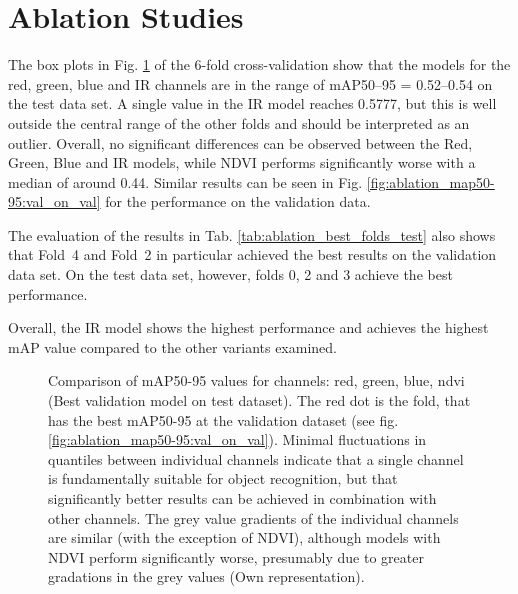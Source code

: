 \section{Ablation Studies}

The box plots in Fig. \ref{fig:ablation_map50-95:val_on_test} of the 6-fold cross-validation show that the models for the red, green, blue and IR channels are in the range of mAP50–95 = 0.52–0.54 on the test data set. A single value in the IR model reaches 0.5777, but this is well outside the central range of the other folds and should be interpreted as an outlier. Overall, no significant differences can be observed between the Red, Green, Blue and IR models, while NDVI performs significantly worse with a median of around 0.44. Similar results can be seen in Fig. \ref{fig:ablation_map50-95:val_on_val} for the performance on the validation data.

The evaluation of the results in Tab. \ref{tab:ablation_best_folds_test} also shows that Fold~4 and Fold~2 in particular achieved the best results on the validation data set. On the test data set, however, folds 0, 2 and 3 achieve the best performance.  

Overall, the IR model shows the highest performance and achieves the highest \acrshort{mAP} value compared to the other variants examined.




\begin{figure}[htbp]
    \centering
    
    \caption[Comparison of \acrshort{mAP}50-95 values for channels: red, green, blue, ndvi (Best validation model on test dataset)]{Comparison of \acrshort{mAP}50-95 values for channels: red, green, blue, ndvi (Best validation model on test dataset). The red dot is the fold, that has the best \acrshort{mAP}50-95 at the validation dataset (see fig. \ref{fig:ablation_map50-95:val_on_val}). Minimal fluctuations in quantiles between individual channels indicate that a single channel is fundamentally suitable for object recognition, but that significantly better results can be achieved in combination with other channels. The grey value gradients of the individual channels are similar (with the exception of NDVI), although models with NDVI perform significantly worse, presumably due to greater gradations in the grey values (Own representation).}
    \label{fig:ablation_map50-95:val_on_test}
\end{figure}


